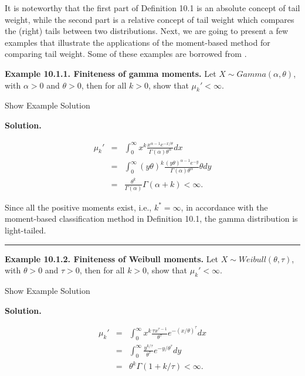 \documentclass[]{book}
\theoremstyle{definition}
\theoremstyle{definition}
\theoremstyle{definition}
\theoremstyle{remark}
\begin{document}
It is noteworthy that the first part of Definition 10.1 is an absolute
concept of tail weight, while the second part is a relative concept of
tail weight which compares the (right) tails between two distributions.
Next, we are going to present a few examples that illustrate the
applications of the moment-based method for comparing tail weight. Some
of these examples are borrowed from \citet{klugman2012}.

\textbf{Example 10.1.1. Finiteness of gamma moments.} Let
\(X\sim Gamma(\alpha,\theta)\), with \(\alpha>0\) and \(\theta>0\), then
for all \(k>0\), show that \(\mu_k' < \infty\).

Show Example Solution

\hypertarget{toggleExamplePortMgt.1.1}{}
\textbf{Solution.}

\begin{eqnarray*}
    \mu_k' &=& \int_0^{\infty} x^k \frac{x^{\alpha-1} e^{-x/\theta}}{\Gamma(\alpha) \theta^{\alpha}} dx \\
    &=& \int_0^{\infty} (y\theta)^k  \frac{(y\theta)^{\alpha-1} e^{-y}}{\Gamma(\alpha) \theta^{\alpha}} \theta dy \\
    &=& \frac{\theta^k}{\Gamma(\alpha)} \Gamma(\alpha+k) < \infty.
\end{eqnarray*}

Since all the positive moments exist, i.e., \(k^{\ast}=\infty\), in
accordance with the moment-based classification method in Definition
10.1, the gamma distribution is light-tailed.

\begin{center}\rule{0.5\linewidth}{\linethickness}\end{center}

\textbf{Example 10.1.2. Finiteness of Weibull moments.} Let
\(X\sim Weibull(\theta,\tau)\), with \(\theta>0\) and \(\tau>0\), then
for all \(k>0\), show that \(\mu_k' < \infty\).

Show Example Solution

\hypertarget{toggleExamplePortMgt.1.2}{}
\textbf{Solution.}

\begin{eqnarray*}
    \mu_k' &=& \int_0^{\infty} x^k \frac{\tau x^{\tau-1} }{\theta^{\tau}} e^{-(x/\theta)^{\tau}}dx \\
    &=& \int_0^{\infty}  \frac{ y^{k/\tau} }{\theta^{\tau}} e^{-y/\theta^{\tau}}dy \\
    &=& \theta^{k} \Gamma(1+k/\tau) < \infty.
\end{eqnarray*}
\end{document}
